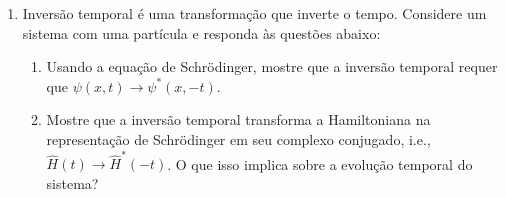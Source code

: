 \begin{enumerate}
\begin{enumerate}
		            $x$. Mostre que o operador de reflexão é unitário e auto-adjunto.
		            Encontre as auto-funções e auto-valores do operador de reflexão.
		      \item Mostre que o operador paridade $\hat{P}$ pode ser escrito como
		            uma rotação seguida de uma reflexão. Mostre que o operador paridade é
		            unitário e auto-adjunto. Encontre as auto-funções e auto-valores do operador
		            paridade.
	      \end{enumerate}
	\item Inversão temporal é uma transformação que inverte o tempo. Considere um
	      sistema com uma partícula e responda às questões abaixo:
	      \begin{enumerate}
		      \item Usando a equação de Schrödinger, mostre que a inversão temporal
		            requer que $\psi(x,t)\rightarrow\psi^*(x,-t)$.
		      \item Mostre que a inversão temporal transforma a Hamiltoniana na
		            representação de Schrödinger em seu complexo conjugado, i.e.,
		            $\hat{H}(t)\rightarrow\hat{H}^*(-t)$.
		            O que isso implica sobre a evolução temporal do sistema?
	      \end{enumerate}
\end{enumerate}



